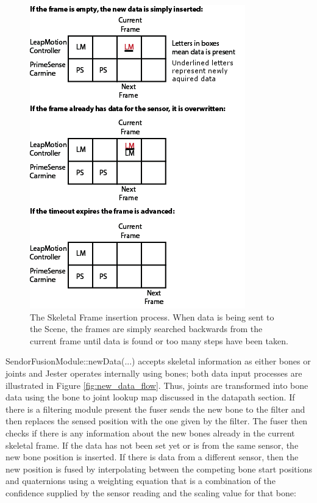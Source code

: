 \begin{figure}[]
\centering
\includegraphics[width=.7\textwidth]{figures/frameFull}
\caption{The Skeletal Frame insertion process. When data is being sent to the Scene, the frames are simply searched backwards from the current frame until data is found or too many steps have been taken.}
\label{fig:skeleton_frames}
\end{figure}

SendorFusionModule::newData(...) accepts skeletal information as either bones or joints and Jester operates internally using bones; both data input processes are illustrated in Figure \ref{fig:new_data_flow}. Thus, joints are transformed into bone data using the bone to joint lookup map discussed in the datapath section. If there is a filtering module present the fuser sends the new bone to the filter and then replaces the sensed position with the one given by the filter. The fuser then checks if there is any information about the new bones already in the current skeletal frame. If the data has not been set yet or is from the same sensor, the new bone position is inserted. If there is data from a different sensor, then the new position is fused by interpolating between the competing bone start positions and quaternions using a weighting equation that is a combination of the confidence supplied by the sensor reading and the scaling value for that bone:

